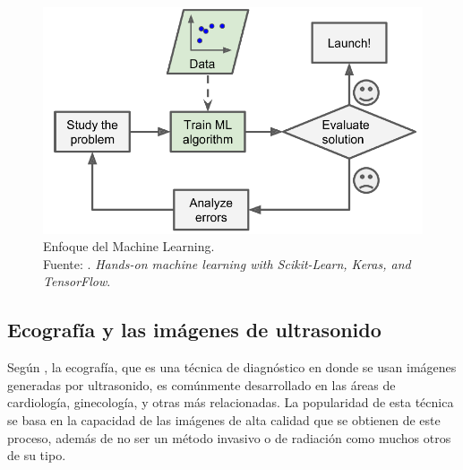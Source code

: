 \begin{figure}[H]
	\begin{center}
		\includegraphics[width=1.00\textwidth]{2/figures/enfoque_ml.png}
		\caption[Enfoque del Machine Learning]{Enfoque del Machine Learning. \\
		Fuente: \cite{bk_geron2022handml}. \textit{Hands-on machine learning with Scikit-Learn, Keras, and TensorFlow}.}
		\label{2:fig209}
	\end{center}
\end{figure}

\subsection{Ecografía y las imágenes de ultrasonido}
Según \cite{pr_herrera2017diseimp}, la ecografía, que es una técnica de diagnóstico en donde se usan imágenes generadas por ultrasonido, es comúnmente desarrollado en las áreas de cardiología, ginecología, y otras más relacionadas. La popularidad de esta técnica se basa en la capacidad de las imágenes de alta calidad que se obtienen de este proceso, además de no ser un método invasivo o de radiación como muchos otros de su tipo.





